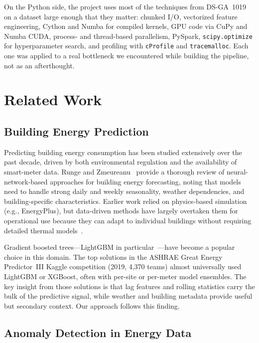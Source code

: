 \documentclass[conference]{IEEEtran}
\begin{document}
On the Python side, the project uses most of the techniques from DS-GA~1019 on a dataset large enough that they matter: chunked I/O, vectorized feature engineering, Cython and Numba for compiled kernels, GPU code via CuPy and Numba CUDA, process- and thread-based parallelism, PySpark, \texttt{scipy.optimize} for hyperparameter search, and profiling with \texttt{cProfile} and \texttt{tracemalloc}. Each one was applied to a real bottleneck we encountered while building the pipeline, not as an afterthought.

\section{Related Work}

\subsection{Building Energy Prediction}

Predicting building energy consumption has been studied extensively over the past decade, driven by both environmental regulation and the availability of smart-meter data. Runge and Zmeureanu~\cite{runge2019} provide a thorough review of neural-network-based approaches for building energy forecasting, noting that models need to handle strong daily and weekly seasonality, weather dependencies, and building-specific characteristics. Earlier work relied on physics-based simulation (e.g., EnergyPlus), but data-driven methods have largely overtaken them for operational use because they can adapt to individual buildings without requiring detailed thermal models~\cite{molina2017}.

Gradient boosted trees---LightGBM in particular~\cite{ke2017}---have become a popular choice in this domain. The top solutions in the ASHRAE Great Energy Predictor~III Kaggle competition (2019, 4,370 teams) almost universally used LightGBM or XGBoost, often with per-site or per-meter model ensembles. The key insight from those solutions is that lag features and rolling statistics carry the bulk of the predictive signal, while weather and building metadata provide useful but secondary context. Our approach follows this finding.

\subsection{Anomaly Detection in Energy Data}
\end{document}
